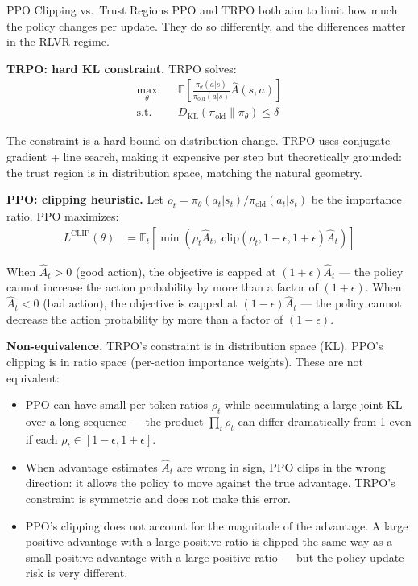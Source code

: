 \begin{thinkfirst}{PPO Clipping vs.\ Trust Regions}
PPO and TRPO both aim to limit how much the policy changes per update. They do so differently, and the differences matter in the RLVR regime.

\textbf{TRPO: hard KL constraint.} TRPO solves:
\begin{align*}
  \max_\theta \quad & \mathbb{E}\!\left[\frac{\pi_\theta(a|s)}{\pi_{\text{old}}(a|s)} \hat{A}(s,a)\right] \\
  \text{s.t.} \quad & D_{\mathrm{KL}}(\pi_{\text{old}} \| \pi_\theta) \leq \delta
\end{align*}

The constraint is a hard bound on distribution change. TRPO uses conjugate gradient + line search, making it expensive per step but theoretically grounded: the trust region is in distribution space, matching the natural geometry.

\textbf{PPO: clipping heuristic.} Let $\rho_t = \pi_\theta(a_t|s_t) / \pi_{\text{old}}(a_t|s_t)$ be the importance ratio. PPO maximizes:
\begin{align*}
  L^{\text{CLIP}}(\theta) &= \mathbb{E}_t\!\left[\min\!\left(\rho_t \hat{A}_t,\; \text{clip}(\rho_t, 1-\epsilon, 1+\epsilon) \hat{A}_t\right)\right]
\end{align*}

When $\hat{A}_t > 0$ (good action), the objective is capped at $(1+\epsilon)\hat{A}_t$ --- the policy cannot increase the action probability by more than a factor of $(1+\epsilon)$. When $\hat{A}_t < 0$ (bad action), the objective is capped at $(1-\epsilon)\hat{A}_t$ --- the policy cannot decrease the action probability by more than a factor of $(1-\epsilon)$.

\textbf{Non-equivalence.} TRPO's constraint is in distribution space (KL). PPO's clipping is in ratio space (per-action importance weights). These are not equivalent:

\begin{itemize}
  \item PPO can have small per-token ratios $\rho_t$ while accumulating a large joint KL over a long sequence --- the product $\prod_t \rho_t$ can differ dramatically from 1 even if each $\rho_t \in [1-\epsilon, 1+\epsilon]$.
  \item When advantage estimates $\hat{A}_t$ are wrong in sign, PPO clips in the wrong direction: it allows the policy to move against the true advantage. TRPO's constraint is symmetric and does not make this error.
  \item PPO's clipping does not account for the magnitude of the advantage. A large positive advantage with a large positive ratio is clipped the same way as a small positive advantage with a large positive ratio --- but the policy update risk is very different.
\end{itemize}


\end{thinkfirst}
